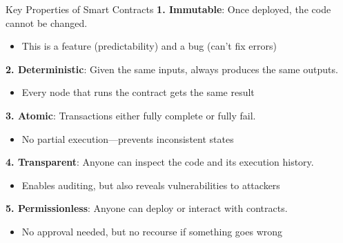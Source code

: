 \documentclass[10pt]{beamer}
\begin{document}
\begin{frame}{Key Properties of Smart Contracts}
  \textbf{1. Immutable}: Once deployed, the code cannot be changed.
  \begin{itemize}
    \item This is a feature (predictability) and a bug (can't fix errors)
  \end{itemize}
  
  \vspace{0.5em}
  \textbf{2. Deterministic}: Given the same inputs, always produces the same outputs.
  \begin{itemize}
    \item Every node that runs the contract gets the same result
  \end{itemize}
  
  \vspace{0.5em}
  \textbf{3. Atomic}: Transactions either fully complete or fully fail.
  \begin{itemize}
    \item No partial execution---prevents inconsistent states
  \end{itemize}
  
  \vspace{0.5em}
  \textbf{4. Transparent}: Anyone can inspect the code and its execution history.
  \begin{itemize}
    \item Enables auditing, but also reveals vulnerabilities to attackers
  \end{itemize}
  
  \vspace{0.5em}
  \textbf{5. Permissionless}: Anyone can deploy or interact with contracts.
  \begin{itemize}
    \item No approval needed, but no recourse if something goes wrong
  \end{itemize}
\end{frame}
\end{document}
